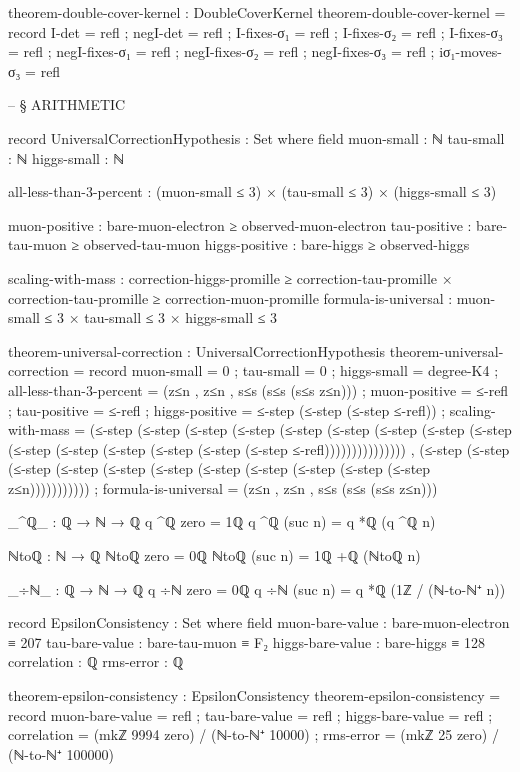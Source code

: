 \documentclass[11pt,a4paper]{book}
\begin{document}
\begin{code}
theorem-double-cover-kernel : DoubleCoverKernel
theorem-double-cover-kernel = record
  { I-det         = refl
  ; negI-det      = refl
  ; I-fixes-σ₁    = refl
  ; I-fixes-σ₂    = refl
  ; I-fixes-σ₃    = refl
  ; negI-fixes-σ₁ = refl
  ; negI-fixes-σ₂ = refl
  ; negI-fixes-σ₃ = refl
  ; iσ₁-moves-σ₃  = refl
  }


-- § ARITHMETIC

record UniversalCorrectionHypothesis : Set where
  field
    muon-small : ℕ
    tau-small : ℕ
    higgs-small : ℕ
    
    all-less-than-3-percent : (muon-small ≤ 3) × (tau-small ≤ 3) × (higgs-small ≤ 3)
    
    muon-positive : bare-muon-electron ≥ observed-muon-electron
    tau-positive : bare-tau-muon ≥ observed-tau-muon
    higgs-positive : bare-higgs ≥ observed-higgs
    
    scaling-with-mass : correction-higgs-promille ≥ correction-tau-promille ×
                        correction-tau-promille ≥ correction-muon-promille
    formula-is-universal : muon-small ≤ 3 × tau-small ≤ 3 × higgs-small ≤ 3

theorem-universal-correction : UniversalCorrectionHypothesis
theorem-universal-correction = record
  { muon-small = 0
  ; tau-small = 0
  ; higgs-small = degree-K4
  ; all-less-than-3-percent = (z≤n , z≤n , s≤s (s≤s (s≤s z≤n)))
  ; muon-positive = ≤-refl
  ; tau-positive = ≤-refl
  ; higgs-positive = ≤-step (≤-step (≤-step ≤-refl))
  ; scaling-with-mass = (≤-step (≤-step (≤-step (≤-step (≤-step (≤-step (≤-step (≤-step (≤-step (≤-step (≤-step (≤-step (≤-step (≤-step (≤-step ≤-refl))))))))))))))) , 
                         (≤-step (≤-step (≤-step (≤-step (≤-step (≤-step (≤-step (≤-step (≤-step (≤-step (≤-step z≤n)))))))))))
  ; formula-is-universal = (z≤n , z≤n , s≤s (s≤s (s≤s z≤n)))
  }

_^ℚ_ : ℚ → ℕ → ℚ
q ^ℚ zero = 1ℚ
q ^ℚ (suc n) = q *ℚ (q ^ℚ n)

ℕtoℚ : ℕ → ℚ
ℕtoℚ zero = 0ℚ
ℕtoℚ (suc n) = 1ℚ +ℚ (ℕtoℚ n)

_÷ℕ_ : ℚ → ℕ → ℚ
q ÷ℕ zero = 0ℚ
q ÷ℕ (suc n) = q *ℚ (1ℤ / (ℕ-to-ℕ⁺ n))

record EpsilonConsistency : Set where
  field
    muon-bare-value  : bare-muon-electron ≡ 207
    tau-bare-value   : bare-tau-muon ≡ F₂
    higgs-bare-value : bare-higgs ≡ 128
    correlation      : ℚ
    rms-error        : ℚ

theorem-epsilon-consistency : EpsilonConsistency
theorem-epsilon-consistency = record
  { muon-bare-value  = refl
  ; tau-bare-value   = refl
  ; higgs-bare-value = refl
  ; correlation      = (mkℤ 9994 zero) / (ℕ-to-ℕ⁺ 10000)
  ; rms-error        = (mkℤ 25 zero) / (ℕ-to-ℕ⁺ 100000)
  }


\end{code}
\end{document}
